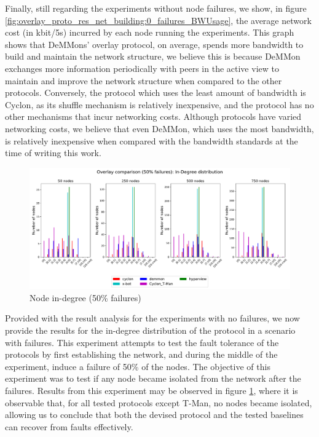 Finally, still regarding the experiments without node failures, we show, in figure \ref{fig:overlay_proto_res_net_building:0_failures_BWUsage}, the average network cost (in kbit/5s) incurred by each node running the experiments. This graph shows that DeMMons' overlay protocol, on average, spends more bandwidth to build and maintain the network structure, we believe this is because DeMMon exchanges more information periodically with peers in the active view to maintain and improve the network structure when compared to the other protocols. Conversely, the protocol which uses the least amount of bandwidth is Cyclon, as its shuffle mechanism is relatively inexpensive, and the protocol has no other mechanisms that incur networking costs. Although protocols have varied networking costs, we believe that even DeMMon, which uses the most bandwidth, is relatively inexpensive when compared with the bandwidth standards at the time of writing this work.

\begin{figure}
    \centering
    \includegraphics[width=\linewidth]{Chapters/evaluation/figures/membership/membership_inDegree_50_failures.pdf}
    \caption{Node in-degree (50\% failures)}
    \label{fig:overlay_proto_res_net_building:50_failures_inDegree}
\end{figure}

Provided with the result analysis for the experiments with no failures, we now provide the results for the in-degree distribution of the protocol in a scenario with failures. This experiment attempts to test the fault tolerance of the protocols by first establishing the network, and during the middle of the experiment, induce a failure of 50\% of the nodes. The objective of this experiment was to test if any node became isolated from the network after the failures. Results from this experiment may be observed in figure \ref{fig:overlay_proto_res_net_building:50_failures_inDegree}, where it is observable that, for all tested protocols except T-Man, no nodes became isolated, allowing us to conclude that both the devised protocol and the tested baselines can recover from faults effectively.

